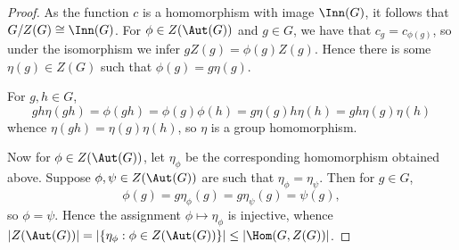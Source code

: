 \documentclass[12pt]{article}
\begin{document}
\begin{homeworkProblem}
\begin{proof}
As the function $ c $  is a homomorphism with image $ \Inn(G) $, it follows that $ G/Z(G) \cong \Inn(G) $. For $ \phi\in Z(\Aut(G)) $ and $ g\in G $, we have that $ c_{g} = c_{\phi(g)} $, so under the isomorphism we infer $ gZ(g) = \phi(g)Z(g) $. Hence there is some $ \eta(g)\in Z(G) $ such that $ \phi(g) = g \eta(g) $. 

For $ g,h\in G $,
\[
  gh \eta(gh) = \phi(gh) = \phi(g) \phi(h) = g\eta(g) h \eta(h) = gh\eta(g)\eta(h)
\]
whence $ \eta(gh) = \eta(g)\eta(h) $, so $ \eta $ is a group homomorphism.

Now for $ \phi\in Z(\Aut(G)) $, let $ \eta_{\phi} $ be the corresponding homomorphism obtained above. Suppose $ \phi,\psi\in Z(\Aut(G)) $ are such that $ \eta_{\phi} = \eta_{\psi} $. Then for $ g\in G $,
\[
  \phi(g) = g \eta_{\phi}(g) = g \eta_{\psi}(g) = \psi(g),
\]
so $ \phi=\psi $. Hence the assignment $ \phi\mapsto \eta_{\phi} $ is injective, whence $ |Z(\Aut(G))|=|\{\eta_{\phi}: \phi\in Z(\Aut(G))\}|\leq |\Hom(G,Z(G))| $.
\end{proof}

\end{homeworkProblem}
\end{document}
